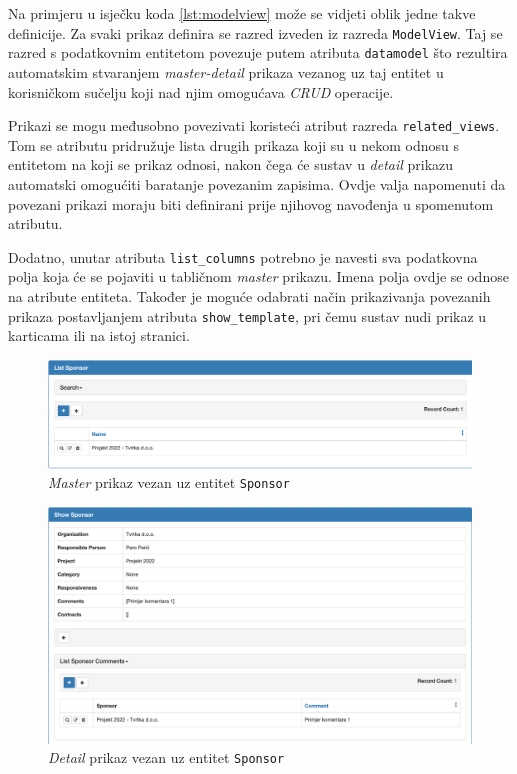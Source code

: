 \documentclass[times, utf8, diplomski]{fer}
\begin{document}
Na primjeru u isječku koda \ref{lst:modelview} može se vidjeti oblik jedne takve
definicije. Za svaki prikaz definira se razred izveden iz razreda
\texttt{ModelView}. Taj se razred s podatkovnim entitetom povezuje putem atributa
\texttt{datamodel} što rezultira automatskim stvaranjem \emph{master-detail}
prikaza vezanog uz taj entitet u korisničkom sučelju koji nad njim omogućava
\emph{CRUD} operacije.

Prikazi se mogu međusobno povezivati koristeći atribut razreda
\texttt{related\_views}. Tom se atributu pridružuje lista drugih prikaza koji su
u nekom odnosu s entitetom na koji se prikaz odnosi, nakon čega će sustav
u \emph{detail} prikazu automatski omogućiti baratanje povezanim zapisima. Ovdje
valja napomenuti da povezani prikazi moraju biti definirani prije njihovog
navođenja u spomenutom atributu.

Dodatno, unutar atributa \texttt{list\_columns} potrebno je navesti sva
podatkovna polja koja će se pojaviti u tabličnom \emph{master} prikazu. Imena
polja ovdje se odnose na atribute entiteta. Također je moguće odabrati način
prikazivanja povezanih prikaza postavljanjem atributa \texttt{show\_template}, pri
čemu sustav nudi prikaz u karticama ili na istoj stranici.

\begin{figure}[H]
    \centering
    \includegraphics[width=1\textwidth]{slike/sponsormaster.png}
    \caption{\emph{Master} prikaz vezan uz entitet \texttt{Sponsor}}
    \label{fig:sponsormaster}
\end{figure}

\begin{figure}[H]
    \centering
    \includegraphics[width=1\textwidth]{slike/sponsordetail.png}
    \caption{\emph{Detail} prikaz vezan uz entitet \texttt{Sponsor}}
    \label{fig:sponsormaster}
\end{figure}
\end{document}

